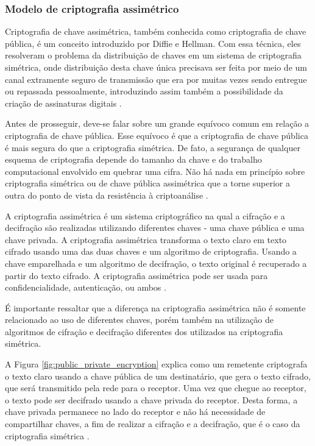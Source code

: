             
        \subsubsection{Modelo de criptografia assimétrico}
        
                Criptografia de chave assimétrica, também conhecida como criptografia de chave pública, é um conceito introduzido por Diffie e Hellman. Com essa técnica, eles resolveram o problema da distribuição de chaves em um sistema de criptografia simétrica, onde  distribuição desta chave única precisava ser feita por meio de um canal extramente seguro de transmissão que era por muitas vezes sendo entregue ou repassada pessoalmente, introduzindo assim também a possibilidade da criação de assinaturas digitais \cite{beginnig_blockchain_bikramaditya}.
                
                Antes de prosseguir, deve-se falar sobre um grande equívoco comum em relação a criptografia de chave pública. Esse equívoco é que a criptografia de chave pública é mais segura do que a criptografia simétrica. De fato, a segurança de qualquer esquema de criptografia depende do tamanho da chave e do trabalho computacional envolvido em quebrar uma cifra. Não há nada em princípio sobre criptografia simétrica ou de chave pública assimétrica que a torne superior a outra do ponto de vista da resistência à criptoanálise  \cite{cryptograpy_and_network_stallings}.

                A criptografia assimétrica é um sistema criptográfico na qual a cifração e a decifração são realizadas utilizando diferentes chaves - uma chave pública e uma chave privada. A criptografia assimétrica transforma o texto claro em texto cifrado usando uma das duas chaves e um algoritmo de criptografia. Usando a chave emparelhada e um algoritmo de decifração, o texto original é recuperado a partir do texto cifrado. A criptografia assimétrica pode ser usada para confidencialidade, autenticação, ou ambos \cite{cryptograpy_and_network_stallings}. 

		É importante ressaltar que a diferença na criptografia assimétrica não é somente relacionado ao uso de diferentes chaves, porém também na utilização de algoritmos de cifração e decifração diferentes dos utilizados na criptografia simétrica.

                A Figura \ref{fig:public_private_encryption} explica como um remetente criptografa o texto claro usando a chave pública de um destinatário, que gera o texto cifrado, que será transmitido pela rede para o receptor. Uma vez que chegue ao receptor, o texto pode ser decifrado usando a chave privada do receptor. Desta forma, a chave privada permanece no lado do receptor e não há necessidade de compartilhar chaves, a fim de realizar a cifração e a decifração, que é o caso da criptografia simétrica \cite{mastering_blockchain}.

